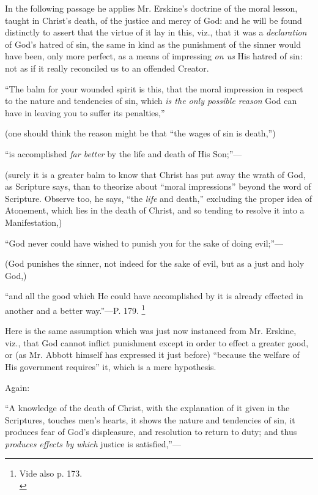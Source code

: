 In the following passage he applies Mr.
Erskine's doctrine of the moral lesson, taught in Christ's death,
of the justice and mercy of God: and he will be found distinctly to
assert that the virtue of it lay in this, viz., that it was a \emph{declaration}
of God's hatred of sin, the same in kind as the punishment of the
sinner would have been, only more perfect, as a means of impressing \emph{on
us} His hatred of sin: not as if it really reconciled us to an
offended Creator.

``The balm for
your wounded spirit is this, that the moral impression in respect to
the nature and tendencies of sin, which \emph{is the only possible reason}
God can have in leaving you to suffer its penalties,''

(one should think the reason might be that ``the
wages of sin is death,'')

``is accomplished
\emph{far better} by the life and death of His Son;''—

(surely it is a greater balm to know that Christ
has put away the wrath of God, as Scripture says, than to theorize
about ``moral impressions'' beyond the word of Scripture. Observe
too, he says, ``the \emph{life} and death,'' excluding the proper
idea of Atonement, which lies in the death of Christ, and so tending
to resolve it into a Manifestation,)

``God never could
have wished to punish you for the sake of doing evil;''—

(God punishes the sinner, not indeed for the sake
of evil, but as a just and holy God,)

``and all the
good which He could have accomplished by it is already effected in
another and a better way.''—P. 179. \footnote{Vide also p. 173.\textbf{}\\}

Here is the same assumption which was just now
instanced from Mr. Erskine, viz., that God cannot inflict punishment
except in order to effect a greater good, or (as Mr. Abbott himself
has expressed it just before) ``because the welfare of His government
requires'' it, which is a mere hypothesis.

Again:

``A knowledge of
the death of Christ, with the explanation of it given in the
Scriptures, touches men's hearts, it shows the nature and tendencies
of sin, it produces fear of God's displeasure, and resolution to
return to duty; and thus \emph{produces effects by which} justice is
satisfied,''—


